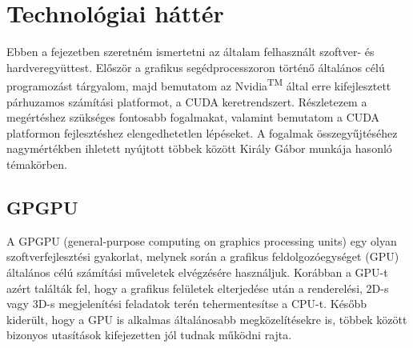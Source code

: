 \chapter{Technológiai háttér}
Ebben a fejezetben szeretném ismertetni az általam felhasznált szoftver- és hardveregyüttest. Először a grafikus segédprocesszoron történő általános célú programozást tárgyalom, majd bemutatom az Nvidia\textsuperscript{TM} által erre kifejlesztett párhuzamos számítási platformot, a CUDA keretrendszert. Részletezem a megértéshez szükséges fontosabb fogalmakat, valamint bemutatom a CUDA platformon fejlesztéshez elengedhetetlen lépéseket. A fogalmak összegyűjtéséhez nagymértékben ihletett nyújtott többek között Király Gábor munkája hasonló témakörben. \cite{kvantum_optim}

\section{GPGPU}
A GPGPU (general-purpose computing on graphics processing units) egy olyan
szoftverfejlesztési gyakorlat, melynek során a grafikus feldolgozóegységet (GPU) általános
célú számítási műveletek elvégzésére használjuk. \cite{kvantum_optim} Korábban a GPU-t azért találták fel, hogy a grafikus felületek elterjedése után a renderelési, 2D-s vagy 3D-s megjelenítési feladatok terén tehermentesítse a CPU-t. Később kiderült, hogy a GPU is alkalmas általánosabb megközelítésekre is, többek között bizonyos utasítások kifejezetten jól tudnak működni rajta.

